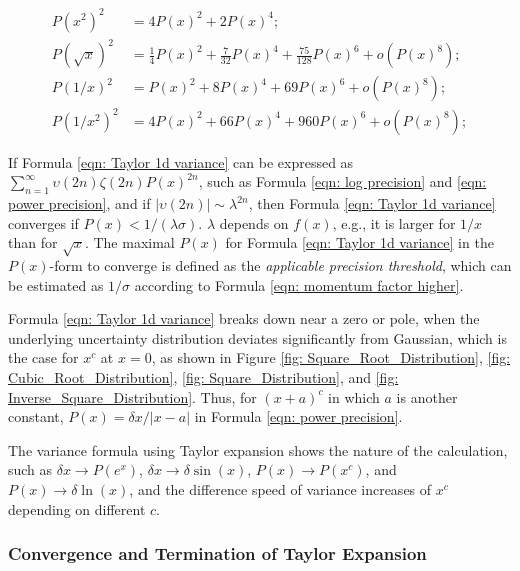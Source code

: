 \documentclass[twoside]{article}
\numberwithin{equation}{section}
\begin{document}
\begin{align}
\label{eqn: square precision}
P(x^2)^2 &= 4 P(x)^2 + 2 P(x)^4; \\
\label{eqn: square root precision}
P(\sqrt{x})^2 &= \frac{1}{4} P(x)^2 + \frac{7}{32} P(x)^4 + \frac{75}{128} P(x)^6 + o(P(x)^8); \\
\label{eqn: inversion precision}
P(1/x)^2 &= P(x)^2 + 8 P(x)^4 + 69 P(x)^6 + o(P(x)^8); \\
\label{eqn: inversion square precision}
P(1/x^2)^2 &= 4 P(x)^2 + 66 P(x)^4 + 960 P(x)^6 + o(P(x)^8);
\end{align}

If Formula \eqref{eqn: Taylor 1d variance} can be expressed as $\sum_{n=1}^{\infty} \upsilon(2n) \zeta(2n) P(x)^{2n}$, such as Formula \eqref{eqn: log precision} and \eqref{eqn: power precision}, and if $|\upsilon(2n)| \sim \lambda^{2n}$, then Formula \eqref{eqn: Taylor 1d variance} converges if $P(x) < 1/(\lambda \sigma)$.
$\lambda$ depends on $f(x)$, e.g., it is larger for $1/x$ than for $\sqrt{x}$.
The maximal $P(x)$ for Formula \eqref{eqn: Taylor 1d variance} in the $P(x)$-form to converge is defined as the \emph{applicable precision threshold}, which can be estimated as $1/\sigma$ according to Formula \eqref{eqn: momentum factor higher}.

Formula \eqref{eqn: Taylor 1d variance} breaks down near a zero or pole, when the underlying uncertainty distribution deviates significantly from Gaussian, which is the case for $x^c$ at $x=0$, as shown in Figure \ref{fig: Square_Root_Distribution}, \ref{fig: Cubic_Root_Distribution}, \ref{fig: Square_Distribution}, and \ref{fig: Inverse_Square_Distribution}.
Thus, for $(x+a)^c$ in which $a$ is another constant, $P(x) = \delta x / |x - a|$ in Formula \eqref{eqn: power precision}.

The variance formula using Taylor expansion shows the nature of the calculation, such as $\delta x \rightarrow P(e^x)$, $\delta x \rightarrow \delta \sin(x)$, $P(x) \rightarrow P(x^c)$, and $P(x) \rightarrow \delta \ln(x)$, and the difference speed of variance increases of $x^c$ depending on different $c$.


\subsubsection{Convergence and Termination of Taylor Expansion}
\end{document}
